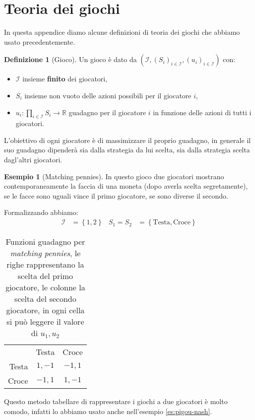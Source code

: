 \documentclass[a4paper]{article}
\theoremstyle{plain}
\theoremstyle{definition}
\newtheorem{mydef}[myteo]{Definizione}
\newtheorem{myes}[myteo]{Esempio}
\theoremstyle{remark}
\newcommand{\set}[1]{\left\{#1\right\}}
\newcommand{\pa}[1]{\left(#1\right)}
\begin{document}
\appendix

\section{Teoria dei giochi}
\label{sec:teoria-giochi}

In questa appendice diamo alcune definizioni di teoria dei giochi che
abbiamo usato precedentemente.

\begin{mydef}[Gioco]%
  Un gioco è dato da $\pa{\mathcal{I},\pa{S_i}_{i\in\mathcal{I}},
    \pa{u_i}_{i\in\mathcal{I}}}$ con:
  \begin{itemize}
  \item $\mathcal{I}$ insieme \textbf{finito} dei giocatori,
  \item $S_i$ insieme non vuoto delle azioni possibili per il
    giocatore $i$,
  \item $u_i: \prod _{i\in\mathcal{I}} S_i \to \mathbb{R}$ guadagno
    per il giocatore $i$ in funzione delle azioni di tutti i
    giocatori.
  \end{itemize}
\end{mydef}

L'obiettivo di ogni giocatore è di massimizzare il proprio guadagno,
in generale il suo guadagno dipenderà sia dalla strategia da lui
scelta, sia dalla strategia scelta dagl'altri giocatori.

\begin{myes}[Matching pennies]
\label{es:matching-pennies}
  In questo gioco due giocatori mostrano contemporaneamente la faccia
  di una moneta (dopo averla scelta segretamente), se le facce sono
  uguali vince il primo giocatore, se sono diverse il secondo.
  
  Formalizzando abbiamo:
  \begin{align*}
    \mathcal{I} &= \set{1,2} &
                               S_1 = S_2 &= \set{\text{Testa},\text{Croce}}
  \end{align*}
  \begin{table}[!ht]
    \centering
    \begin{tabular}{rcc}
      & Testa & Croce \\
      \cline{2-3}
      Testa & \multicolumn{1}{|c|}{$1,-1$} & \multicolumn{1}{|c|}{$-1,1$}  \\
      \cline{2-3}
      Croce & \multicolumn{1}{|c|}{$-1,1$} & \multicolumn{1}{|c|}{$1,-1$}  \\
      \cline{2-3}
    \end{tabular}
    
    \caption{Funzioni guadagno per \textit{matching pennies}, le righe
      rappresentano la scelta del primo giocatore, le colonne la scelta
      del secondo giocatore, in ogni cella si può leggere il valore di
      $u_1,u_2$}
    \label{tab:u1u2-matching-pennies}
  \end{table}
  Questo metodo tabellare di rappresentare i giochi a due giocatori è
  molto comodo, infatti lo abbiamo usato anche nell'esempio
  \ref{es:pigou-nash}.
\end{myes}
\end{document}
